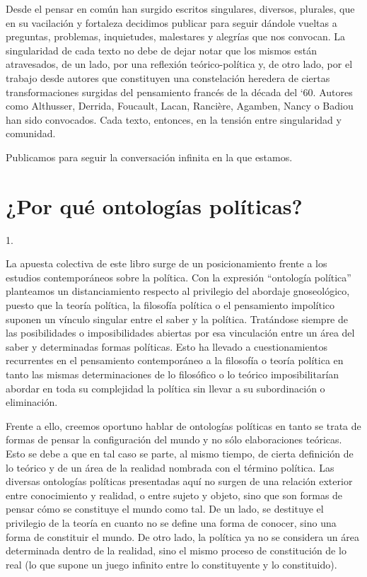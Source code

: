 Desde el pensar en común han surgido escritos singulares, diversos, plurales, que en su vacilación y fortaleza decidimos publicar para seguir dándole vueltas a preguntas, problemas, inquietudes, malestares y alegrías que nos convocan. La singularidad de cada texto no debe de dejar notar que los mismos están atravesados, de un lado, por una reflexión teórico-política y, de otro lado, por el trabajo desde autores que constituyen una constelación heredera de ciertas transformaciones surgidas del pensamiento francés de la década del `60. Autores como Althusser, Derrida, Foucault, Lacan, Rancière, Agamben, Nancy o Badiou han sido convocados. Cada texto, entonces, en la tensión entre singularidad y comunidad.

Publicamos para seguir la conversación infinita en la que estamos.

\chapter{¿Por qué ontologías políticas?}
\Author{ } %
\sectionmark{ } %

1.

La apuesta colectiva de este libro surge de un posicionamiento frente a los estudios contemporáneos sobre la política. Con la expresión \enquote{ontología política} planteamos un distanciamiento respecto al privilegio del abordaje gnoseológico, puesto que la teoría política, la filosofía política o el pensamiento impolítico suponen un vínculo singular entre el saber y la política. Tratándose siempre de las posibilidades o imposibilidades abiertas por esa vinculación entre un área del saber y determinadas formas políticas. Esto ha llevado a cuestionamientos recurrentes en el pensamiento contemporáneo a la filosofía o teoría política en tanto las mismas determinaciones de lo filosófico o lo teórico imposibilitarían abordar en toda su complejidad la política sin llevar a su subordinación o eliminación.

Frente a ello, creemos oportuno hablar de ontologías políticas en tanto se trata de formas de pensar la configuración del mundo y no sólo elaboraciones teóricas. Esto se debe a que en tal caso se parte, al mismo tiempo, de cierta definición de lo teórico y de un área de la realidad nombrada con el término política. Las diversas ontologías políticas presentadas aquí no surgen de una relación exterior entre conocimiento y realidad, o entre sujeto y objeto, sino que son formas de pensar cómo se constituye el mundo como tal. De un lado, se destituye el privilegio de la teoría en cuanto no se define una forma de conocer, sino una forma de constituir el mundo. De otro lado, la política ya no se considera un área determinada dentro de la realidad, sino el mismo proceso de constitución de lo real (lo que supone un juego infinito entre lo constituyente y lo constituido).

